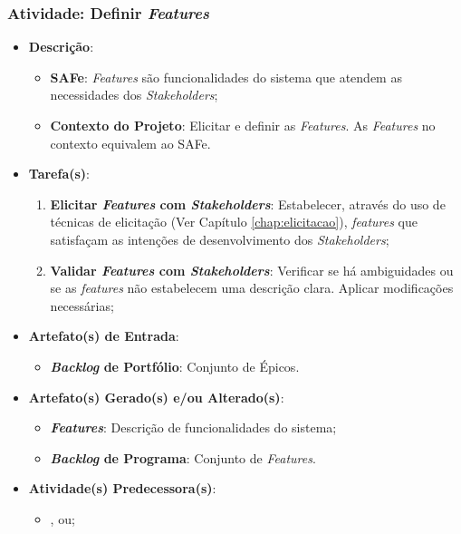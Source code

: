			\subsubsection[Atividade: Definir \emph{Features}]{Atividade: Definir \emph{Features}}
			\label{subsubsec:processo_atividade_programa_definir_feature}
				\begin{itemize}
					\item{\textbf{Descrição}:
						\begin{itemize}
							\item{\textbf{SAFe}: \emph{Features} são funcionalidades do sistema que atendem as necessidades dos \emph{Stakeholders};}
							\item{\textbf{Contexto do Projeto}: Elicitar e definir as \emph{Features}. As \emph{Features} no contexto equivalem ao SAFe.}
						\end{itemize}}
					\item{\textbf{Tarefa(s)}:
						\begin{enumerate}
							\item{\textbf{Elicitar \emph{Features} com \emph{Stakeholders}}: Estabelecer, através do uso de técnicas de elicitação (Ver Capítulo \ref{chap:elicitacao}), \emph{features} que satisfaçam as intenções de desenvolvimento dos \emph{Stakeholders};}
							\item{\textbf{Validar \emph{Features} com \emph{Stakeholders}}: Verificar se há ambiguidades ou se as \emph{features} não estabelecem uma descrição clara. Aplicar modificações necessárias;}
						\end{enumerate}}
					\item{\textbf{Artefato(s) de Entrada}:
						\begin{itemize}
							\item{\textbf{\emph{Backlog} de Portfólio}: Conjunto de Épicos.}
						\end{itemize}}
					\item{\textbf{Artefato(s) Gerado(s) e/ou Alterado(s)}:
						\begin{itemize}
							\item{\textbf{\emph{Features}}: Descrição de funcionalidades do sistema;}
							\item{\textbf{\emph{Backlog} de Programa}: Conjunto de \emph{Features}.}
						\end{itemize}}
					\item{\textbf{Atividade(s) Predecessora(s)}:
						\begin{itemize}
							\item{, ou;}

\end{itemize}}
\end{itemize}

